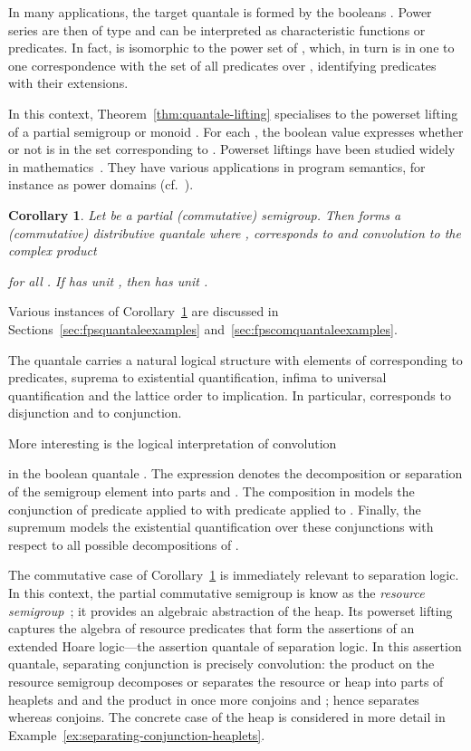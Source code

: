 \documentclass[12pt]{article}
\newtheorem{corollary}{Corollary}
\theoremstyle{definition}
\newcommand{\refthm}[1]{Theorem~\ref{#1}}
\begin{document}
In many applications, the target quantale  is formed by the
booleans . Power series are then of type 
and can  be interpreted as characteristic functions or
predicates. In fact,  is isomorphic to the power set of
, which, in turn is in one to one correspondence with the set of
all predicates over , identifying predicates with their extensions.

In this context, \refthm{thm:quantale-lifting} specialises to the
powerset lifting of a partial semigroup or monoid . For each , the boolean value  expresses whether or not  is in the set
corresponding to . Powerset liftings have been studied widely in
mathematics~\cite{Goldblatt,Brink}. They have various applications in
program semantics, for instance as power domains (cf.~\cite{AbramskyJung}).

\begin{corollary}\label{cor:powerset-lifting}
  Let  be a partial (commutative) semigroup. Then 
  forms a (commutative) distributive quantale where ,  corresponds to  and convolution  to
  the complex product
  
  for all . If  has unit , then 
  has unit .
\end{corollary}
Various instances of Corollary~\ref{cor:powerset-lifting} are discussed
in Sections~\ref{sec:fpsquantaleexamples}
and~\ref{sec:fpscomquantaleexamples}.

The quantale  carries a natural logical structure with
elements of  corresponding to predicates, suprema to
existential quantification, infima to universal quantification and the
lattice order to implication.  In particular,  corresponds to
disjunction and  to conjunction.

More interesting is the logical interpretation of convolution

in the boolean quantale . The expression 
denotes the decomposition or separation of the semigroup element 
into parts  and . The composition  in  models the conjunction of predicate  applied to
 with predicate  applied to . Finally, the supremum 
models the existential quantification over these
conjunctions with respect to all possible decompositions of .

The commutative case of Corollary~\ref{cor:powerset-lifting} is
immediately relevant to separation logic. In this context, the partial
commutative semigroup  is know as the \emph{resource
  semigroup}~\cite{COY07}; it provides an algebraic abstraction of the
heap. Its powerset lifting  captures the algebra of
resource predicates that form the assertions of an extended Hoare
logic---the assertion quantale of separation logic.  In this assertion
quantale, separating conjunction is precisely convolution: the product
 on the resource semigroup  decomposes or separates the
resource or heap  into parts of heaplets  and  and the
product  in  once more
conjoins  and ; hence  separates whereas  conjoins.  The concrete case of the heap
is considered in more detail in
Example~\ref{ex:separating-conjunction-heaplets}.
\end{document}
